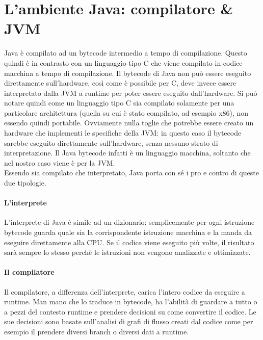 \documentclass[a4paper, 11pt,            %
openright,               %
italian,
english                 
]{article}       %
\begin{document}
	
		\section{L'ambiente Java: compilatore \& JVM}
	
	Java è compilato ad un bytecode intermedio a tempo di compilazione. Questo quindi è in contrasto con un linguaggio tipo C che viene compilato in codice macchina a tempo di compilazione. Il bytecode di Java non può essere eseguito direttamente sull'hardware, così come è possibile per C, deve invece essere interpretato dalla JVM a runtime per poter essere eseguito dall'hardware. Si può notare quindi come un linguaggio tipo C sia compilato solamente per una particolare architettura (quella su cui è stato compilato, ad esempio x86), non essendo quindi portabile. Ovviamente nulla toglie che potrebbe essere creato un hardware che implementi le specifiche della JVM: in questo caso il bytecode sarebbe eseguito direttamente sull'hardware, senza nessuno strato di interpretazione. Il Java bytecode infatti è un linguaggio macchina, soltanto che nel nostro caso viene è per la JVM.\\
	Essendo sia compilato che interpretato, Java porta con sé i pro e contro di queste due tipologie. \\
	\paragraph{L'interprete}
	L'interprete di Java è simile ad un dizionario: semplicemente per ogni istruzione bytecode guarda quale sia la corrispondente istruzione macchina e la manda da eseguire direttamente alla CPU. Se il codice viene eseguito più volte, il risultato sarà sempre lo stesso perchè le istruzioni non vengono analizzate e ottimizzate. \\
	\paragraph{Il compilatore}
	Il compilatore, a differenza dell'interprete, carica l'intero codice da eseguire a runtime. Man mano che lo traduce in bytecode, ha l'abilità di guardare a tutto o a pezzi del contesto runtime e prendere decisioni su come convertire il codice. Le sue decisioni sono basate sull'analisi di grafi di flusso creati dal codice come per esempio il prendere diversi branch o diversi dati a runtime.
	
\end{document}
